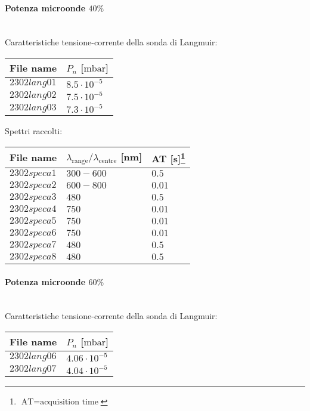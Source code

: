 \paragraph*{Potenza microonde $\text{40\%}$} ~\\
Caratteristiche tensione-corrente della sonda di Langmuir:
\begin{center}
  \begin{tabular}{p{3cm}p{3cm}}
  \toprule
File name	&$P_{n}$ [$\si{\milli\bar}$]\\
  \midrule
$2302lang01$	&$8.5\cdot10^{-5}$\\
$2302lang02$	&$7.5\cdot10^{-5}$\\
$2302lang03$	&$7.3\cdot10^{-5}$\\
  \bottomrule
  \end{tabular}
\end{center}

Spettri raccolti:
\begin{center}
\begin{tabular}{p{3cm}p{3.5cm}p{3.5cm}}
\toprule
File name	&$\lambda_\text{range}\text{/}\lambda_\text{centre}$ [nm] &AT [s]\footnote{$\text{AT}=\text{acquisition time}$}\\
\midrule
$2302speca1$	&$300-600$	&$0.5$\\
$2302speca2$	&$600-800$	&$0.01$\\
$2302speca3$	&$480$		&$0.5$\\
$2302speca4$	&$750$		&$0.01$\\
$2302speca5$	&$750$		&$0.01$\\
$2302speca6$	&$750$		&$0.01$\\
$2302speca7$	&$480$		&$0.5$\\
$2302speca8$	&$480$		&$0.5$\\
\bottomrule
\end{tabular}
\end{center}

\paragraph*{Potenza microonde $\text{60\%}$} ~\\
Caratteristiche tensione-corrente della sonda di Langmuir:
\begin{center}
\begin{tabular}{p{3cm}p{3cm}}
\toprule
File name	&$P_n$ [$\si{\milli\bar}$]\\
\midrule
$2302lang06$	&$4.06\cdot10^{-5}$\\
$2302lang07$	&$4.04\cdot10^{-5}$\\
\bottomrule
\end{tabular}
\end{center}

